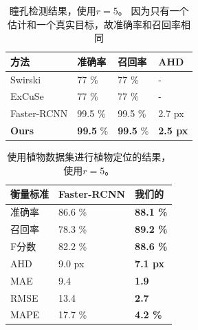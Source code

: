 \documentclass[10pt,twocolumn,letterpaper,UTF8]{article}
\begin{document}
    \begin{table}\centering
    \caption{
             瞳孔检测结果，使用$r=5$。
             因为只有一个估计和一个真实目标，故准确率和召回率相同}
    \begin{tabular}{llll}
    \toprule
        \textbf{方法} & \textbf{准确率} & \textbf{召回率} &  \textbf{AHD} \\
        \midrule
        Swirski \cite{swirski2012} & 77 \% & 77 \%  & - \\
        ExCuSe \cite{fuhl2015} & 77 \% & 77 \%  & - \\
        Faster-RCNN & 99.5 \% & 99.5 \% &  2.7 px  \\
        \textbf{Ours} & \textbf{99.5} \% & \textbf{99.5} \% & \textbf{2.5 px}  \\
    \bottomrule
    \end{tabular}
    \label{tab:pupil}
    \end{table}
    
    \begin{table}
    \centering
    \caption{
            使用植物数据集进行植物定位的结果，使用$r=5$。}
    \begin{tabular}{lll}
    \toprule
    \textbf{衡量标准}  & \textbf{Faster-RCNN} &  \textbf{我们的} \\
    \midrule
    准确率 & 86.6 \%  & \textbf{88.1 \%} \\
    召回率 & 78.3 \%   & \textbf{89.2 \%} \\
    F分数 & 82.2 \%   & \textbf{88.6 \%} \\
    AHD & 9.0 px & \textbf{7.1 px} \\
    MAE & 9.4 & \textbf{1.9}  \\
    RMSE & 13.4 & \textbf{2.7} \\
    MAPE & 17.7 \% & \textbf{4.2 \%} \\
    \bottomrule
    \end{tabular}
    \label{tab:plants}
    \end{table}
\end{document}
